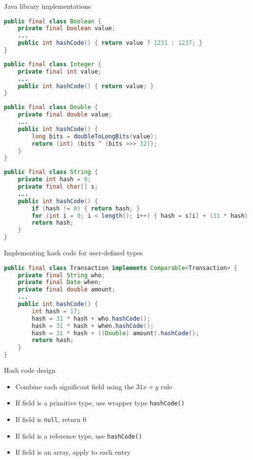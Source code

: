 \documentclass[8pt,a4paper,compress]{beamer}
\begin{document}
\begin{frame}[fragile]
Java library implementations
\begin{lstlisting}[language=Java]
public final class Boolean {
    private final boolean value;
    ...
    public int hashCode() { return value ? 1231 : 1237; }
}
\end{lstlisting}

\begin{lstlisting}[language=Java]
public final class Integer {
    private final int value;
    ...
    public int hashCode() { return value; }
}
\end{lstlisting}

\begin{lstlisting}[language=Java]
public final class Double {
    private final double value;
    ...
    public int hashCode() {
        long bits = doubleToLongBits(value);
        return (int) (bits ^ (bits >>> 32));
    }
}
\end{lstlisting}

\begin{lstlisting}[language=Java]
public final class String {
    private int hash = 0;
    private final char[] s;
    ...
    public int hashCode() {
        if (hash != 0) { return hash; }
        for (int i = 0; i < length(); i++) { hash = s[i] + (31 * hash); }
        return hash;
    }
} 
\end{lstlisting}
\end{frame}

\begin{frame}[fragile]
Implementing hash code for user-defined types
\begin{lstlisting}[language=Java]
public final class Transaction implements Comparable<Transaction> {
    private final String who;
    private final Date when;
    private final double amount;
    ...
    public int hashCode() {
        int hash = 17;
        hash = 31 * hash + who.hashCode();
        hash = 31 * hash + when.hashCode();
        hash = 31 * hash + ((Double) amount).hashCode();
        return hash;
    }
}
\end{lstlisting}

\bigskip

Hash code design
\begin{itemize}
\item Combine each significant field using the $31x + y$ rule

\item If field is a primitive type, use wrapper type \lstinline{hashCode()}

\item If field is \lstinline{null}, return 0

\item If field is a reference type, use \lstinline{hashCode()}

\item If field is an array, apply to each entry
\end{itemize}
\end{frame}
\end{document}
